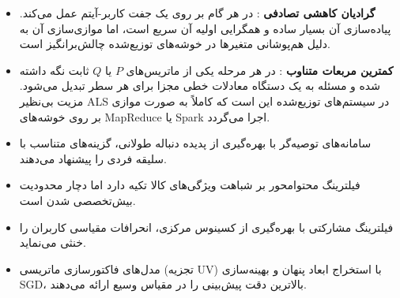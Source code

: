 \begin{examnote}
\begin{itemize}
    \item \textbf{گرادیان کاهشی تصادفی }: در هر گام بر روی یک جفت کاربر-آیتم عمل می‌کند. پیاده‌سازی آن بسیار ساده و همگرایی اولیه آن سریع است، اما موازی‌سازی آن به دلیل هم‌پوشانی متغیرها در خوشه‌های توزیع‌شده چالش‌برانگیز است.
    \item \textbf{کمترین مربعات متناوب }: در هر مرحله یکی از ماتریس‌های $P$ یا $Q$ ثابت نگه داشته شده و مسئله به یک دستگاه معادلات خطی مجزا برای هر سطر تبدیل می‌شود. مزیت بی‌نظیر ALS در سیستم‌های توزیع‌شده این است که کاملاً به صورت موازی  بر روی خوشه‌های MapReduce یا Spark اجرا می‌گردد.
\end{itemize}
\end{examnote}

\begin{summarybox}
\begin{itemize}
    \item سامانه‌های توصیه‌گر با بهره‌گیری از پدیده دنباله طولانی، گزینه‌های متناسب با سلیقه فردی را پیشنهاد می‌دهند.
    \item فیلترینگ محتوامحور بر شباهت ویژگی‌های کالا تکیه دارد اما دچار محدودیت بیش‌تخصصی شدن است.
    \item فیلترینگ مشارکتی با بهره‌گیری از کسینوس مرکزی، انحرافات مقیاسی کاربران را خنثی می‌نماید.
    \item مدل‌های فاکتورسازی ماتریسی (تجزیه UV) با استخراج ابعاد پنهان و بهینه‌سازی SGD، بالاترین دقت پیش‌بینی را در مقیاس وسیع ارائه می‌دهند.
\end{itemize}
\end{summarybox}
